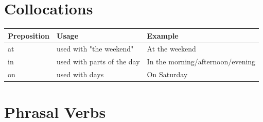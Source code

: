 \section{Collocations}
\begin{longtable}{p{}p{}p{}}
\textbf{Preposition} & \textbf{Usage} & \textbf{Example} \\
\hline
\endhead
at & used with "the weekend" & At the weekend \\
\hline
in & used with parts of the day & In the morning/afternoon/evening \\
\hline
on & used with days & On Saturday \\
\hline
\end{longtable} 



\section{Phrasal Verbs}
